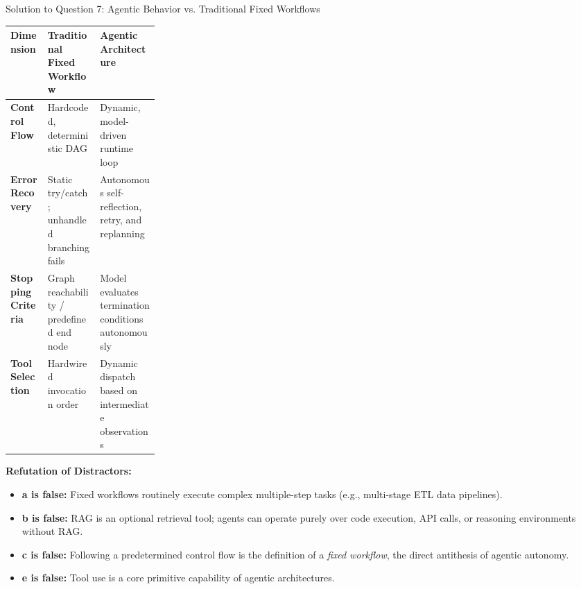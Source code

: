 \documentclass[11pt,a4paper]{article}
\begin{document}
\begin{solutionbox}{Solution to Question 7: Agentic Behavior vs. Traditional Fixed Workflows}
\begin{center}
\small
\begin{tabularx}{\linewidth}{p{0.25\linewidth} >{\raggedright\arraybackslash}X >{\raggedright\arraybackslash}X}
\toprule
\textbf{Dimension} & \textbf{Traditional Fixed Workflow} & \textbf{Agentic Architecture} \\
\midrule
\textbf{Control Flow} & Hardcoded, deterministic DAG & Dynamic, model-driven runtime loop \\
\textbf{Error Recovery} & Static try/catch; unhandled branching fails & Autonomous self-reflection, retry, and replanning \\
\textbf{Stopping Criteria} & Graph reachability / predefined end node & Model evaluates termination conditions autonomously \\
\textbf{Tool Selection} & Hardwired invocation order & Dynamic dispatch based on intermediate observations \\
\bottomrule
\end{tabularx}
\end{center}

\noindent
\textbf{Refutation of Distractors:}
\begin{itemize}[leftmargin=1.5em]
    \item \textbf{a is false:} Fixed workflows routinely execute complex multiple-step tasks (e.g., multi-stage ETL data pipelines).
    \item \textbf{b is false:} RAG is an optional retrieval tool; agents can operate purely over code execution, API calls, or reasoning environments without RAG.
    \item \textbf{c is false:} Following a predetermined control flow is the definition of a \emph{fixed workflow}, the direct antithesis of agentic autonomy.
    \item \textbf{e is false:} Tool use is a core primitive capability of agentic architectures.
\end{itemize}
\end{solutionbox}

\vspace{1.5em}
\end{document}
